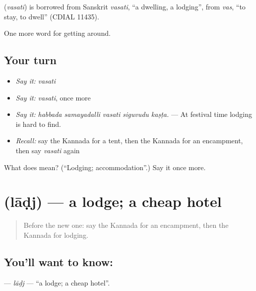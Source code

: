 \begin{cousinweb}
\textbf{} (\emph{vasati}) is borrowed from Sanskrit \emph{vasati}, \textquotedblleft{}a dwelling, a lodging\textquotedblright{}, from \emph{vas}, \textquotedblleft{}to stay, to dwell\textquotedblright{} (CDIAL 11435).
\end{cousinweb}

\begin{grammarlens}[title={What you've built}]
One more word for getting around.
\end{grammarlens}

\subsection*{Your turn}
\begin{itemize}
\raggedright
  \item \emph{Say it:} \emph{vasati}
  \item \emph{Say it:} \emph{vasati}, once more
  \item \emph{Say it:} \emph{habbada samayadalli vasati siguvudu kaṣṭa.} — At festival time lodging is hard to find.
  \item \emph{Recall:} say the Kannada for a tent, then the Kannada for an encampment, then say \emph{vasati} again
\end{itemize}

\begin{tcolorbox}[breakable,colback=teal!4,colframe=teal!35!black,title={Before you move on}]
What does  mean? (\textquotedblleft{}Lodging; accommodation\textquotedblright{}.) Say it once more.
\end{tcolorbox}
\section[\texorpdfstring{\kn{ಲಾಡ್ಜ್} (lāḍj)}{ಲಾಡ್ಜ್ (lāḍj)}]{ (lāḍj) — a lodge; a cheap hotel}

\label{lesson:KA-C460-ladj}



\begin{quote}
Before the new one: say the Kannada for an encampment, then the Kannada for lodging.
\end{quote}

\subsection*{You'll want to know: }
\textbf{} — \emph{lāḍj} — \textquotedblleft{}a lodge; a cheap hotel\textquotedblright{}.

